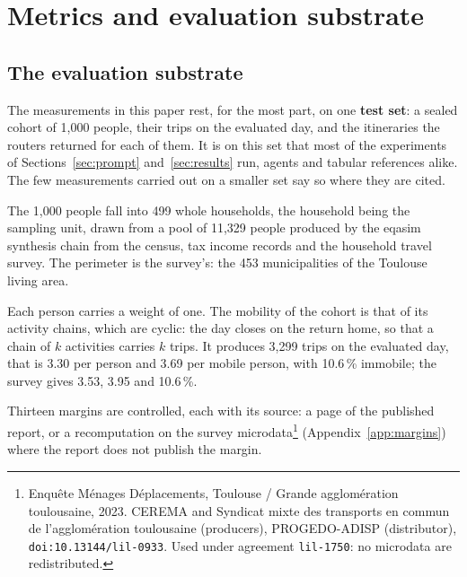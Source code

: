 \section{Metrics and evaluation substrate}
\label{sec:metrics}

\subsection{The evaluation substrate}
\label{sec:substrate}

The measurements in this paper rest, for the most part, on one \textbf{test set}: a sealed cohort of 1,000 people, their trips on the evaluated day, and the itineraries the routers returned for each of them. It is on this set that most of the experiments of Sections~\ref{sec:prompt} and~\ref{sec:results} run, agents and tabular references alike. The few measurements carried out on a smaller set say so where they are cited.

The 1,000 people fall into 499 whole households, the household being the sampling unit, drawn from a pool of 11,329 people produced by the eqasim synthesis chain \citep{horl2021eqasim} from the census, tax income records and the household travel survey. The perimeter is the survey's: the 453 municipalities of the Toulouse living area.

Each person carries a weight of one. The mobility of the cohort is that of its activity chains, which are cyclic: the day closes on the return home, so that a chain of $k$ activities carries $k$ trips. It produces 3,299 trips on the evaluated day, that is 3.30 per person and 3.69 per mobile person, with 10.6\,\% immobile; the survey gives 3.53, 3.95 and 10.6\,\%.

Thirteen margins are controlled, each with its source: a page of the published report, or a recomputation on the survey microdata\footnote{Enquête Ménages Déplacements, Toulouse / Grande agglomération toulousaine, 2023. CEREMA and Syndicat mixte des transports en commun de l'agglomération toulousaine (producers), PROGEDO-ADISP (distributor), \texttt{doi:10.13144/lil-0933}. Used under agreement \texttt{lil-1750}: no microdata are redistributed.} (Appendix~\ref{app:margins}) where the report does not publish the margin.

